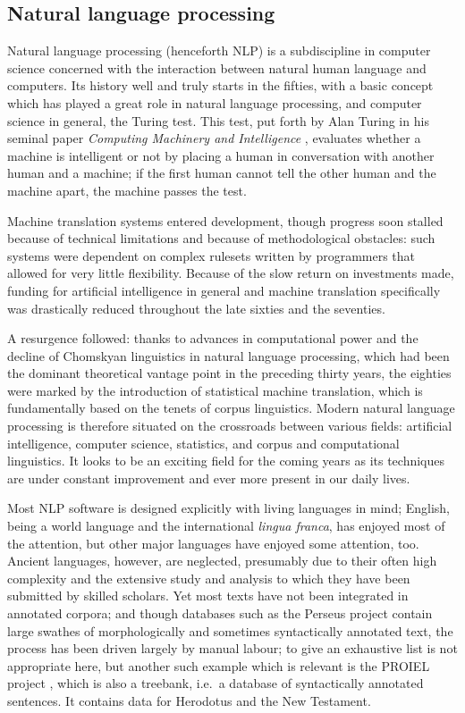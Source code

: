 \subsection{Natural language processing} 

Natural language processing (henceforth NLP) is a subdiscipline in computer
science concerned with the interaction between natural human language and
computers. Its history well and truly starts in the fifties, with a basic
concept which has played a great role in natural language processing, and
computer science in general, the Turing test. This test, put forth by Alan
Turing in his seminal paper \textit{Computing Machinery and Intelligence}
\citep{turing1950}, evaluates whether a machine is intelligent or not by
placing a human in conversation with another human and a machine; if the first
human cannot tell the other human and the machine apart, the machine passes the test.

Machine translation systems entered development, though progress soon stalled
because of technical limitations and because of methodological obstacles: such
systems were dependent on complex rulesets written by programmers that allowed
for very little flexibility. Because of the slow return on investments made,
funding for artificial intelligence in general and machine translation
specifically was drastically reduced throughout the late sixties and the seventies.

A resurgence followed: thanks to advances in computational power and the
decline of Chomskyan linguistics in natural language processing, which had been
the dominant theoretical vantage point in the preceding thirty years, the
eighties were marked by the introduction of statistical machine translation,
which is fundamentally based on the tenets of corpus linguistics. Modern
natural language processing is therefore situated on the crossroads between
various fields: artificial intelligence, computer science, statistics, and
corpus and computational linguistics. It looks to be an exciting field for the
coming years as its techniques are under constant improvement and ever more
present in our daily lives.

Most NLP software is designed explicitly with living languages in mind;
English, being a world language and the international \textit{lingua franca},
has enjoyed most of the attention, but other major languages have enjoyed some
attention, too. Ancient languages, however, are neglected, presumably due to
their often high complexity and the extensive study and analysis to which they
have been submitted by skilled scholars. Yet most texts have not been
integrated in annotated corpora; and though databases such as the Perseus
project contain large swathes of morphologically and sometimes syntactically
annotated text, the process has been driven largely by manual labour; to give
an exhaustive list is not appropriate here, but another such example which is
relevant is the PROIEL project \citep{proiel}, which is also a treebank, i.e.\ a database of
syntactically annotated sentences. It contains data for Herodotus and the New Testament.

